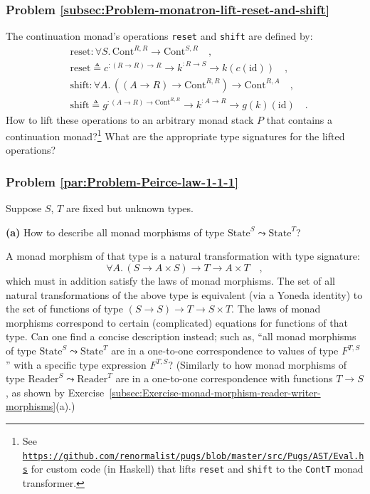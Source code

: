 \subsubsection{Problem \label{subsec:Problem-monatron-lift-reset-and-shift}\ref{subsec:Problem-monatron-lift-reset-and-shift}}

The continuation monad\textsf{'}s operations \lstinline!reset! and \lstinline!shift!
are defined by:
\begin{align*}
 & \text{reset}:\forall S.\,\text{Cont}^{R,R}\rightarrow\text{Cont}^{S,R}\quad,\\
 & \text{reset}\triangleq c^{:\left(R\rightarrow R\right)\rightarrow R}\rightarrow k^{:R\rightarrow S}\rightarrow k(c(\text{id}))\quad,\\
 & \text{shift}:\forall A.\,((A\rightarrow R)\rightarrow\text{Cont}^{R,R})\rightarrow\text{Cont}^{R,A}\quad,\\
 & \text{shift}\triangleq g^{:\left(A\rightarrow R\right)\rightarrow\text{Cont}^{R,R}}\rightarrow k^{:A\rightarrow R}\rightarrow g(k)(\text{id})\quad.
\end{align*}
How to lift these operations to an arbitrary monad stack $P$ that
contains a continuation monad?\footnote{See \texttt{\href{https://github.com/renormalist/pugs/blob/master/src/Pugs/AST/Eval.hs}{https://github.com/renormalist/pugs/blob/master/src/Pugs/AST/Eval.hs}}
for custom code (in Haskell) that lifts \lstinline!reset! and \lstinline!shift!
to the \lstinline!ContT! monad transformer.} What are the appropriate type signatures for the lifted operations?

\subsubsection{Problem \label{par:Problem-Peirce-law-1-1-1}\ref{par:Problem-Peirce-law-1-1-1}}

Suppose $S$, $T$ are fixed but unknown types.

\textbf{(a)} How to describe all monad morphisms of type $\text{State}^{S}\leadsto\text{State}^{T}$?

A monad morphism of that type is a natural transformation with type
signature:
\[
\forall A.\,(S\rightarrow A\times S)\rightarrow T\rightarrow A\times T\quad,
\]
which must in addition satisfy the laws of monad morphisms. The set
of all natural transformations of the above type is equivalent (via
a Yoneda identity) to the set of functions of type $(S\rightarrow S)\rightarrow T\rightarrow S\times T$.
The laws of monad morphisms correspond to certain (complicated) equations
for functions of that type. Can one find a concise description instead;
such as, \textsf{``}all monad morphisms of type $\text{State}^{S}\leadsto\text{State}^{T}$
are in a one-to-one correspondence to values of type $F^{T,S}$\textsf{''}
with a specific type expression $F^{T,S}$? (Similarly to how monad
morphisms of type $\text{Reader}^{S}\leadsto\text{Reader}^{T}$ are
in a one-to-one correspondence with functions $T\rightarrow S$, as
shown by Exercise~\ref{subsec:Exercise-monad-morphism-reader-writer-morphisms}(a).)

